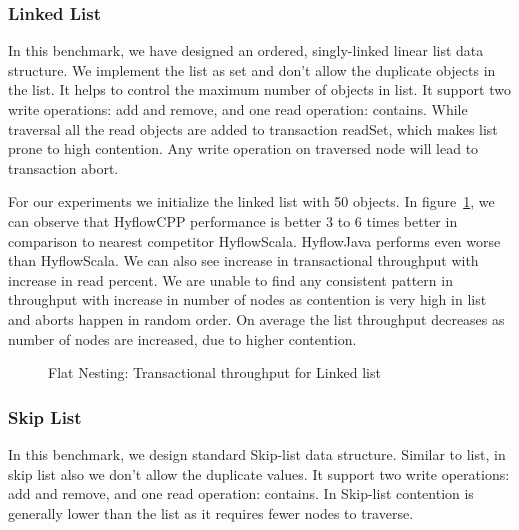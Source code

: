 \documentclass[12pt,english]{report}
\begin{document}
\subsubsection{Linked List}

In this benchmark, we have designed an ordered, singly-linked linear list data structure. We implement the list as set and don't allow the duplicate objects in the list. It helps to control the maximum number of objects in list. It support two write operations: add and remove, and one read operation: contains. While traversal all the read objects are added to transaction readSet, which makes list prone to high contention. Any write operation on traversed node will lead to transaction abort.

For our experiments we initialize the linked list with 50 objects. In figure~\ref{Fig:flatList}, we can observe that HyflowCPP performance is better 3 to 6 times better in comparison to nearest competitor HyflowScala. HyflowJava performs even worse than HyflowScala. We can also see increase in transactional throughput with increase in read percent. We are unable to find any consistent pattern in throughput with increase in number of nodes as contention is very high in list and aborts happen in random order. On average the list throughput decreases as number of nodes are increased, due to higher contention.

\begin{figure}[H]
\centering
{}
\end{figure}
\begin{figure}[H]
\centering
{}
\end{figure}
\begin{figure}[H]
\centering
{}
\caption{Flat Nesting: Transactional throughput for Linked list}
\label{Fig:flatList}
\end{figure}

\subsubsection{Skip List}

In this benchmark, we design standard Skip-list data structure. Similar to list, in skip list also we don't allow the duplicate values. It support two write operations: add and remove, and one read operation: contains. In Skip-list contention is generally lower than the list as it requires fewer nodes to traverse. 
\end{document}
